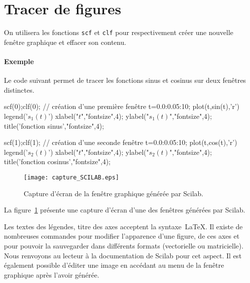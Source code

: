 \section{Tracer de figures}
On utilisera les fonctions \verb?scf? et \verb?clf?  pour respectivement
créer une nouvelle fenêtre graphique et effacer son contenu. 
\paragraph{Exemple}
Le code suivant permet de tracer les fonctions sinus et cosinus sur deux 
fenêtres distinctes. 
\begin{Scilabcode}
scf(0);clf(0); // création d'une première fenêtre
t=0.0:0.05:10; 
plot(t,sin(t),'r')
legend('$s_1(t)$')
xlabel("$t$","fontsize",4);
ylabel("$s_1(t)$","fontsize",4);
title('fonction sinus',"fontsize",4);

scf(1);clf(1); // création d'une seconde fenêtre    
t=0.0:0.05:10;
plot(t,cos(t),'r')
legend('$s_2(t)$')
xlabel("$t$","fontsize",4);
ylabel("$s_2(t)$","fontsize",4);
title('fonction cosinus',"fontsize",4);  
\end{Scilabcode}
\begin{figure}[!ht]
    \centering
    \texttt{[image: capture\_SCILAB.eps]}
    \caption{Capture d'écran de la fenêtre graphique générée 
             par Scilab.\label{fig-capture-SCILAB}}
\end{figure}
La figure~\cref{fig-capture-SCILAB} présente une capture d'écran 
d'une des fenêtres générées par Scilab.
          
Les textes des légendes, titre des axes acceptent la syntaxe~\LaTeX.
Il existe de nombreuses commandes pour modifier l'apparence
d'une figure, de ces axes et pour pouvoir la sauvegarder
dans différents formats (vectorielle ou matricielle).
Nous renvoyons au lecteur à la documentation de Scilab pour
cet aspect. Il est également possible d'éditer une image en accédant
au menu de la fenêtre graphique après l'avoir générée.
